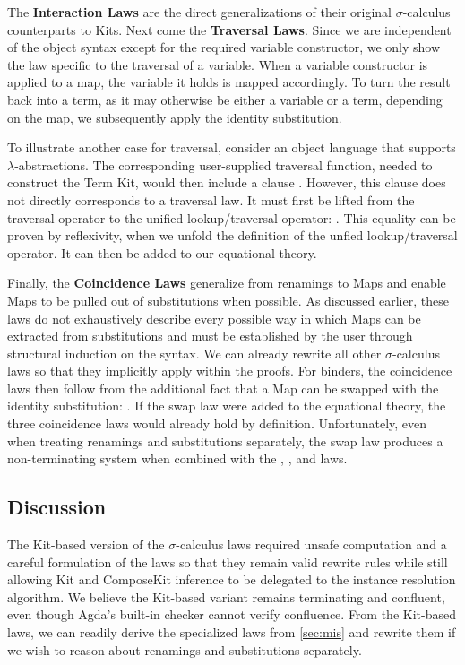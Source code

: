 \documentclass[screen,nonacm]{acmart}
\begin{document}
The \textbf{Interaction Laws} are the direct generalizations of their original
$σ$-calculus counterparts to Kits. Next come the \textbf{Traversal Laws}. Since
we are independent of the object syntax except for the required variable
constructor, we only show the law specific to the traversal of a variable. When
a variable constructor is applied to a map, the variable it holds is mapped
accordingly. To turn the result back into a term, as it may otherwise be either
a variable or a term, depending on the map, we subsequently apply the identity
substitution.

To illustrate another case for traversal, consider an object language that
supports $λ$-abstractions. The corresponding user-supplied traversal function,
needed to construct the Term Kit, would then include a clause \FSLambdaExT.
However, this clause does not directly corresponds to a traversal law. It must
first be lifted from the traversal operator to the unified lookup/traversal
operator: \FSLambdaExL. This equality can be proven by reflexivity, when we
unfold the definition of the unfied lookup/traversal operator. It can then be
added to our equational theory.

Finally, the \textbf{Coincidence Laws} generalize from renamings to Maps and
enable Maps to be pulled out of substitutions when possible. As discussed
earlier, these laws do not exhaustively describe every possible way in which
Maps can be extracted from substitutions and must be established by the user
through structural induction on the syntax. We can already rewrite all other
$\sigma$-calculus laws so that they implicitly apply within the proofs. For
binders, the coincidence laws then follow from the additional fact that a Map
can be swapped with the identity substitution: \ANormId{}. If the swap law were
added to the equational theory, the three coincidence laws would already hold
by definition. Unfortunately, even when treating renamings and substitutions
separately, the swap law produces a non-terminating system when combined with
the , , and
 laws.

\subsection{Discussion}
The Kit-based version of the $σ$-calculus laws required unsafe computation and
a careful formulation of the laws so that they remain valid rewrite rules while
still allowing Kit and ComposeKit inference to be delegated to the instance
resolution algorithm. We believe the Kit-based variant remains terminating and
confluent, even though Agda’s built-in checker cannot verify confluence. From
the Kit-based laws, we can readily derive the specialized laws from
\cref{sec:mis} and rewrite them if we wish to reason about renamings and
substitutions separately.
\end{document}
